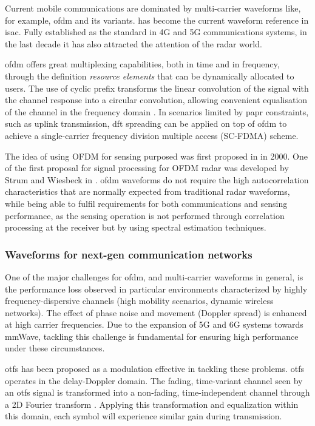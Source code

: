 	Current mobile communications are dominated by multi-carrier waveforms like, for example, \gls{ofdm} and its variants.
	 has become the current waveform reference in \gls{isac}. Fully established as the standard in 4G and 5G communications systems, in the last decade it has also attracted the attention of the radar world.
	
	\gls{ofdm} offers great multiplexing capabilities, both in time and in frequency, through the definition \textit{resource elements} that can be dynamically allocated to users. The use of cyclic prefix transforms the linear convolution of the signal with the channel response into a circular convolution, allowing convenient equalisation of the channel in the frequency domain \cite{Wild_Grudnitsky_Mandelli_Henninger_Guan_Schaich_2023}. In scenarios limited by \gls{papr} constraints, such as uplink transmission, \gls{dft} spreading can  be applied on top of \gls{ofdm} to achieve a single-carrier frequency division multiple access (SC-FDMA) scheme.
	
	The idea of using OFDM for sensing purposed was first proposed in \cite{Levanon_ofdm} in 2000. One of the first proposal for signal processing for OFDM radar was developed by Strum and Wiesbeck in \cite{Sturm_Wiesbeck_2011}.
	\gls{ofdm} waveforms do not require the high autocorrelation characteristics that are normally expected from traditional radar waveforms, while being able to fulfil requirements for both communications and sensing performance, as the sensing operation is not performed through correlation processing at the receiver but by using spectral estimation techniques.
	
	
	\subsubsection{Waveforms for next-gen communication networks}
	
	One of the major challenges for \gls{ofdm}, and multi-carrier waveforms in general, is the performance loss observed in particular environments characterized by highly frequency-dispersive channels (\eg high mobility scenarios, dynamic wireless networks).
	The effect of phase noise and movement (Doppler spread) is enhanced at high carrier frequencies. 
	Due to the expansion of 5G and 6G systems towards mmWave, tackling this challenge is fundamental for ensuring high performance under these circumstances.
	
	\Gls{otfs} has been proposed as a modulation effective in tackling these problems. \Gls{otfs} operates in the delay-Doppler domain. 
	The fading, time-variant channel seen by an \gls{otfs} signal is transformed into a non-fading, time-independent channel through a 2D Fourier transform \cite{OTFS_Hadani_2017_mmWave}. 
	Applying this transformation and equalization within this domain, each symbol will experience similar gain during transmission.
	
